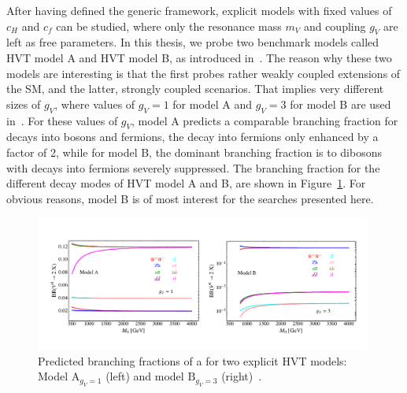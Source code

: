 After having defined the generic framework, explicit models with fixed values of $c_H$ and $c_f$ can be studied, where only the resonance mass $m_V$ and coupling $g_V$ are left as free parameters.
In this thesis, we probe two benchmark models called HVT model A and HVT model B, as introduced in~\cite{Pappadopulo:2014qza}. The reason why these two models are interesting is that the first probes rather weakly coupled extensions of the SM, and the latter, strongly coupled scenarios. That implies very different sizes of $g_V$, where values of $g_V = 1$ for model A and $g_V = 3$ for model B are used in~\cite{Pappadopulo:2014qza}. For these values of $g_V$, model A predicts a comparable branching fraction for decays into bosons and fermions, the decay into fermions only enhanced by a factor of 2, while for model B, the dominant branching fraction is to dibosons with decays into fermions severely suppressed. The branching fraction for the different decay modes of HVT model A and B, are shown in Figure~\ref{fig:theory:hvtBR}. For obvious reasons, model B is of most interest for the searches presented here.
\begin{figure}[h!]
\centering
\includegraphics[width=0.99\textwidth]{figures/theory/hvtmodels.pdf}
\caption{Predicted branching fractions of a \PZpr for two explicit HVT models: Model  $\mathrm{A}_{g_V=1}$ (left) and model $\mathrm{B}_{g_V=3}$ (right)~\cite{Pappadopulo:2014qza}.}
\label{fig:theory:hvtBR}
\end{figure}

